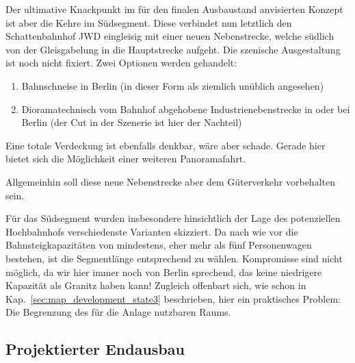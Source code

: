 Der ultimative Knackpunkt im f\"ur den finalen Ausbaustand anvisierten Konzept ist aber die Kehre im S\"udsegment.
Diese verbindet nun letztlich den Schattenbahnhof JWD eingleisig mit einer neuen Nebenstrecke, welche s\"udlich von der Gleisgabelung in die Hauptstrecke aufgeht.
Die szenische Ausgestaltung ist noch nicht fixiert.
Zwei Optionen werden gehandelt:
\begin{enumerate}
	\item Bahnschneise in Berlin (in dieser Form als ziemlich un\"ublich angesehen)
	\item Dioramatechnisch vom Bahnhof abgehobene Industrienebenstrecke in oder bei Berlin (der Cut in der Szenerie ist hier der Nachteil)
\end{enumerate}
Eine totale Verdeckung ist ebenfalls denkbar, w\"are aber schade.
Gerade hier bietet sich die M\"oglichkeit einer weiteren Panoramafahrt.

Allgemeinhin soll diese neue Nebenstrecke aber dem G\"uterverkehr vorbehalten sein.

F\"ur das S\"udsegment wurden insbesondere hinsichtlich der Lage des potenziellen Hochbahnhofs verschiedenste Varianten skizziert.
Da nach wie vor die Bahnsteigkapazit\"aten von mindestens, eher mehr als f\"unf Personenwagen bestehen, ist die Segmentl\"ange entsprechend zu w\"ahlen.
Kompromisse sind nicht m\"oglich, da wir hier immer noch von Berlin sprechend, das keine niedrigere Kapazit\"at als Granitz haben kann!
Zugleich offenbart sich, wie schon in Kap.~\ref{sec:map_development_state3} beschrieben, hier ein praktisches Problem:
Die Begrenzung des f\"ur die Anlage nutzbaren Raums.




\subsection{Projektierter Endausbau}
\label{sec:map_final_projected}


